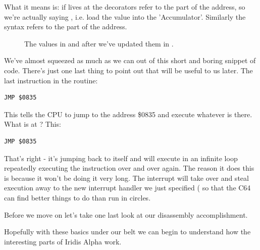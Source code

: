 What it means is:
if  lives at  the \icode{\#<} decorators refer to the  part of the
address, so we're actually saying , i.e. load the value  into the 'Accumulator'. Similarly the syntax
 refers to the  part of the address.

\begin{figure}[H]
  {
    \setlength{\tabcolsep}{3.0pt}
    \setlength\cmidrulewidth{\heavyrulewidth} %
    \begin{adjustbox}{width=7cm,center}
    \end{adjustbox}
  }\caption{The values in  and  after we've updated them in .}
\end{figure}

We've almost squeezed as much as we can out of this short and boring snippet of code. There's just one last thing to point
out that will be useful to us later. The last instruction in the routine:

\begin{lstlisting}[caption=Jump.,escapechar=\%]
JMP $0835
\end{lstlisting}

This tells the CPU to jump to the address \$0835 and execute whatever is there. What is at ? This:

\begin{lstlisting}[caption=Hello again.,escapechar=\%]
JMP $0835
\end{lstlisting}

That's right - it's jumping back to itself and will execute in an infinite loop repeatedly executing the instruction
over and over again. The reason it does this is because it won't be doing it very long. The interrupt will take over
and steal execution away to the new interrupt handler we just specified ( so that the C64 can find better things to do than run in circles.

Before we move on let's take one last look at our disassembly accomplishment.



Hopefully with these basics under our belt we can begin to understand how the interesting parts of Iridis Alpha work.
